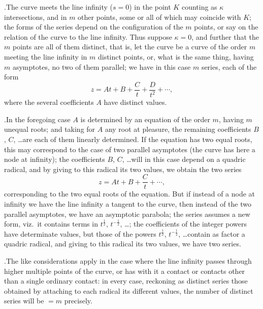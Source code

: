 \documentclass[11pt]{article}
\begin{document}
\medskip

.\quad The curve meets the line infinity ($s = 0$) in the point $K$ counting as $\kappa$ intersections, and in $m$ other points, some or all of which may coincide with $K$; the forms of the series depend on the configuration of the $m$ points, or say on the relation of the curve to the line infinity. Thus suppose $\kappa = 0$, and further that the $m$ points are all of them distinct, that is, let the curve be a curve of the order $m$ meeting the line infinity in $m$ distinct points, or, what is the same thing, having $m$ asymptotes, no two of them parallel; we have in this case $m$ series, each of the form
\[
z = At + B + \frac{C}{t} + \frac{D}{t^{2}} + \cdots,
\]
where the several coefficients $A$ have distinct values.

\medskip

.\quad In the foregoing case $A$ is determined by an equation of the order $m$, having $m$ unequal roots; and taking for $A$ any root at pleasure, the remaining coefficients $B$, $C$, \ldots are each of them linearly determined. If the equation has two equal roots, this may correspond to the case of two parallel asymptotes (the curve has here a node at infinity); the coefficients $B$, $C$, \ldots will in this case depend on a quadric radical, and by giving to this radical its two values, we obtain the two series
\[
z = At + B + \frac{C}{t} + \cdots,
\]
corresponding to the two equal roots of the equation. But if instead of a node at infinity we have the line infinity a tangent to the curve, then instead of the two parallel asymptotes, we have an asymptotic parabola; the series assumes a new form, viz.\ it contains terms in $t^{\frac{1}{2}}$, $t^{-\frac{1}{2}}$, \ldots; the coefficients of the integer powers have determinate values, but those of the powers $t^{\frac{1}{2}}$, $t^{-\frac{1}{2}}$, \ldots contain as factor a quadric radical, and giving to this radical its two values, we have two series.

\medskip

.\quad The like considerations apply in the case where the line infinity passes through higher multiple points of the curve, or has with it a contact or contacts other than a single ordinary contact: in every case, reckoning as distinct series those obtained by attaching to each radical its different values, the number of distinct series will be $= m$ precisely.

\medskip
\end{document}

